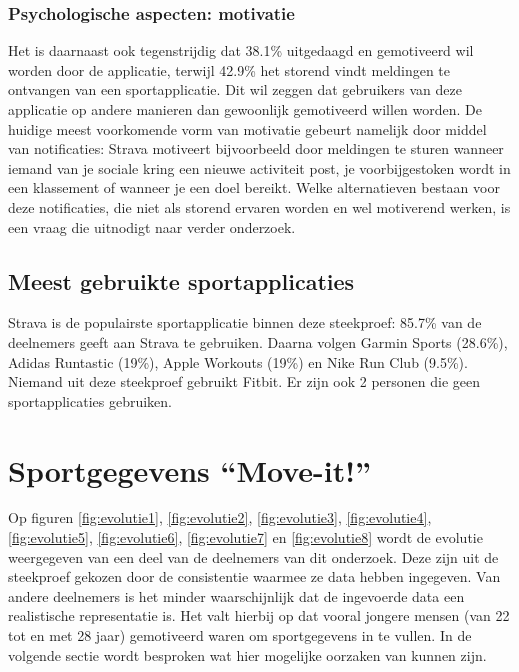 \subsubsection{Psychologische aspecten: motivatie}

Het is daarnaast ook tegenstrijdig dat 38.1\% uitgedaagd en gemotiveerd wil worden door de applicatie, terwijl 42.9\% het storend vindt meldingen te ontvangen van een sportapplicatie. Dit wil zeggen dat gebruikers van deze applicatie op andere manieren dan gewoonlijk gemotiveerd willen worden.
De huidige meest voorkomende vorm van motivatie gebeurt namelijk door middel van notificaties:
Strava motiveert bijvoorbeeld door meldingen te sturen wanneer iemand van je sociale kring een nieuwe activiteit post, je voorbijgestoken wordt in een klassement of wanneer je een doel bereikt.
Welke alternatieven bestaan voor deze notificaties, die niet als storend ervaren worden en wel motiverend werken, is een vraag die uitnodigt naar verder onderzoek.

\subsection{Meest gebruikte sportapplicaties}

Strava is de populairste sportapplicatie binnen deze steekproef: 85.7\% van de deelnemers geeft aan Strava te gebruiken. Daarna volgen Garmin Sports (28.6\%), Adidas Runtastic (19\%), Apple Workouts (19\%) en Nike Run Club (9.5\%). Niemand uit deze steekproef gebruikt Fitbit. Er zijn ook 2 personen die geen sportapplicaties gebruiken.

\section{Sportgegevens ``Move-it!''}

Op figuren \ref{fig:evolutie1}, \ref{fig:evolutie2}, \ref{fig:evolutie3}, \ref{fig:evolutie4}, \ref{fig:evolutie5}, \ref{fig:evolutie6}, \ref{fig:evolutie7} en \ref{fig:evolutie8} wordt de evolutie weergegeven van een deel van de deelnemers van dit onderzoek. Deze zijn uit de steekproef gekozen door de consistentie waarmee ze data hebben ingegeven. Van andere deelnemers is het minder waarschijnlijk dat de ingevoerde data een realistische representatie is. Het valt hierbij op dat vooral jongere mensen (van 22 tot en met 28 jaar) gemotiveerd waren om sportgegevens in te vullen. In de volgende sectie wordt besproken wat hier mogelijke oorzaken van kunnen zijn.

